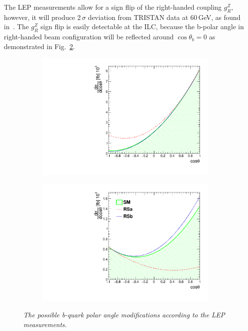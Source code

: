 The LEP measurements allow for a sign flip of the right-handed coupling $g_R^Z$, however, it will produce 2\,$\sigma$ deviation from TRISTAN data at 60\,GeV, as found in~\cite{bib:RSTOP}.
The $g_R^Z$ sign flip is easily detectable at the ILC, because the b-polar angle in right-handed beam configuration will be reflected around $\cos\theta_b = 0$ as demonstrated in Fig.~\ref{fig:dsResult_b_3}. 
\begin{figure}
	\centering
	\begin{subfigure}{0.5\textwidth}
		\includegraphics[width=0.99\textwidth]{ILD/plots/ds-left.pdf}
		\caption{\label{fig:dsResult_a_3} }
	\end{subfigure}%
	\begin{subfigure}{0.5\textwidth}
		\centering
		\includegraphics[width=0.99\textwidth]{ILD/plots/ds-right.pdf}
		\caption{\label{fig:dsResult_b_3} }
	\end{subfigure}
	\caption{\sl The possible b-quark polar angle modifications according to the LEP measurements. }
	\label{fig:dsResult_3}
\end{figure}

